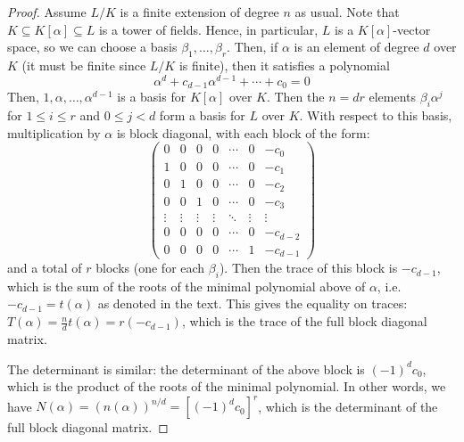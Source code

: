 \begin{proof}
    Assume $L/K$ is a finite extension of degree $n$ as usual. Note that $K \subseteq K[\alpha] \subseteq L$ is a tower of fields. Hence, in particular, $L$ is a $K[\alpha]$-vector space, so we can choose a basis $\beta_1,\ldots,\beta_r$. Then, if $\alpha$ is an element of degree $d$ over $K$ (it must be finite since $L/K$ is finite), then it satisfies a polynomial
    \[ \alpha^d + c_{d-1}\alpha^{d-1} + \cdots + c_0 = 0 \]
    Then, $1,\alpha,\ldots,\alpha^{d-1}$ is a basis for $K[\alpha]$ over $K$. Then the $n = dr$ elements $\beta_i\alpha^j$ for $1 \leq i \leq r$ and $0 \leq j < d$ form a basis for $L$ over $K$. With respect to this basis, multiplication by $\alpha$ is block diagonal, with each block of the form:
    \[ \left(\begin{array}{ccccccc} 0 & 0 & 0 & 0 & \cdots & 0 & -c_0 \\ 1 & 0 & 0 & 0 & \cdots & 0 & -c_1 \\ 0 & 1 & 0 & 0 & \cdots & 0 & -c_2 \\ 0 & 0 & 1 & 0 & \cdots & 0 & -c_3 \\ \vdots & \vdots & \vdots & \vdots & \ddots & \vdots & \vdots \\ 0 & 0 & 0 & 0 & \cdots & 0 & -c_{d-2} \\ 0 & 0 & 0 & 0 & \cdots & 1 & -c_{d-1} \end{array}\right) \]
    and a total of $r$ blocks (one for each $\beta_i$). Then the trace of this block is $-c_{d-1}$, which is the sum of the roots of the minimal polynomial above of $\alpha$, i.e. $-c_{d-1} = t(\alpha)$ as denoted in the text. This gives the equality on traces: $T(\alpha) = \frac{n}{d}t(\alpha) = r(-c_{d-1})$, which is the trace of the full block diagonal matrix.

    The determinant is similar: the determinant of the above block is $(-1)^dc_0$, which is the product of the roots of the minimal polynomial. In other words, we have $N(\alpha) = (n(\alpha))^{n/d} = \left[(-1)^dc_0\right]^r$, which is the determinant of the full block diagonal matrix.
\end{proof}
